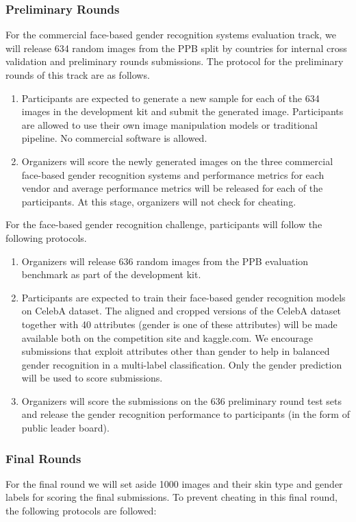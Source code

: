 \documentclass[11pt, oneside]{article}
\begin{document}
\subsubsection{Preliminary Rounds}

For the commercial face-based gender recognition systems evaluation track, we will release 634 random images from the PPB split by countries for internal cross validation and preliminary rounds submissions. The protocol for the preliminary rounds of this track are as follows.

\begin{enumerate}
    \item Participants are expected to generate a new sample for each of the 634 images in the development kit and submit the generated image. Participants are allowed to use their own image manipulation models or traditional pipeline. No commercial software is allowed.
    \item Organizers will score the newly generated images on the three commercial face-based gender recognition systems and performance metrics for each vendor and average performance metrics will be released for each of the participants. At this stage, organizers will not check for cheating.
\end{enumerate}

For the face-based gender recognition challenge, participants will follow the following protocols.

\begin{enumerate}
    \item Organizers will release 636 random images from the PPB evaluation benchmark as part of the development kit.
    \item Participants are expected to train their face-based gender recognition models on CelebA dataset. The aligned and cropped versions of the CelebA dataset together with 40 attributes (gender is one of these attributes) will be made available both on the competition site and kaggle.com. We encourage submissions that exploit attributes other than gender to help in balanced gender recognition in a multi-label classification. Only the gender prediction will be used to score submissions.
    \item Organizers will score the submissions on the 636 preliminary round test sets and release the gender recognition performance to participants (in the form of public leader board).
\end{enumerate}

\subsubsection{Final Rounds}
For the final round we will set aside 1000 images and their skin type and gender labels for scoring the final submissions. To prevent cheating in this final round, the following protocols are followed:
\end{document}
